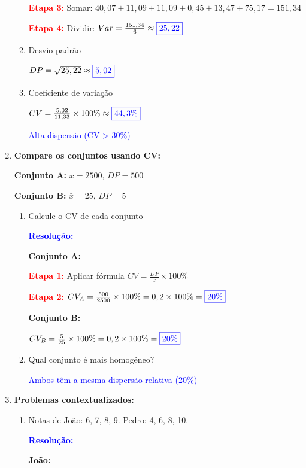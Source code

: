 \documentclass[11pt]{article}
\newcommand{\respostaNum}[1]{\textcolor{blue}{\boxed{#1}}}
\newcommand{\respostaTxt}[1]{\textcolor{blue}{#1}}
\newcommand{\resolucao}{\textbf{\textcolor{blue}{Resolução:}}}
\begin{document}
\begin{multicols}{2}
\begin{enumerate}[leftmargin=*]
\begin{enumerate}[label=\alph*)]
\textbf{\textcolor{red}{Etapa 3:}} Somar: $40,07 + 11,09 + 11,09 + 0,45 + 13,47 + 75,17 = 151,34$

\textbf{\textcolor{red}{Etapa 4:}} Dividir: $Var = \frac{151,34}{6} \approx \respostaNum{25,22}$

\item Desvio padrão

$DP = \sqrt{25,22} \approx \respostaNum{5,02}$

\item Coeficiente de variação

$CV = \frac{5,02}{11,33} \times 100\% \approx \respostaNum{44,3\%}$

\respostaTxt{Alta dispersão (CV > 30\%)}
\end{enumerate}

\item \textbf{Compare os conjuntos usando CV:}

\textbf{Conjunto A:} $\bar{x} = 2500$, $DP = 500$

\textbf{Conjunto B:} $\bar{x} = 25$, $DP = 5$

\begin{enumerate}[label=\alph*)]
\item Calcule o CV de cada conjunto

\resolucao

\textbf{Conjunto A:}

\textbf{\textcolor{red}{Etapa 1:}} Aplicar fórmula $CV = \frac{DP}{\bar{x}} \times 100\%$

\textbf{\textcolor{red}{Etapa 2:}} $CV_A = \frac{500}{2500} \times 100\% = 0,2 \times 100\% = \respostaNum{20\%}$

\textbf{Conjunto B:}

$CV_B = \frac{5}{25} \times 100\% = 0,2 \times 100\% = \respostaNum{20\%}$

\item Qual conjunto é mais homogêneo?

\respostaTxt{Ambos têm a mesma dispersão relativa (20\%)}
\end{enumerate}

\item \textbf{Problemas contextualizados:}

\begin{enumerate}[label=\alph*)]
\item Notas de João: 6, 7, 8, 9. Pedro: 4, 6, 8, 10.

\resolucao

\textbf{João:}


\end{enumerate}
\end{enumerate}
\end{multicols}
\end{document}
